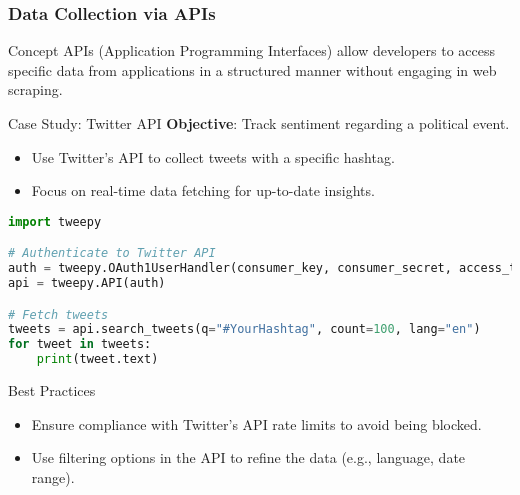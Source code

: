 \documentclass{beamer}
\begin{document}
\begin{frame}[fragile]
    \frametitle{Data Collection via APIs}
    
    \begin{block}{Concept}
        APIs (Application Programming Interfaces) allow developers to access specific data from applications in a structured manner without engaging in web scraping.
    \end{block}
    
    \begin{block}{Case Study: Twitter API}
        \textbf{Objective}: Track sentiment regarding a political event.
        \begin{itemize}
            \item Use Twitter's API to collect tweets with a specific hashtag.
            \item Focus on real-time data fetching for up-to-date insights.
        \end{itemize}
    \end{block}
    
    \begin{lstlisting}[language=Python]
import tweepy

# Authenticate to Twitter API
auth = tweepy.OAuth1UserHandler(consumer_key, consumer_secret, access_token, access_token_secret)
api = tweepy.API(auth)

# Fetch tweets
tweets = api.search_tweets(q="#YourHashtag", count=100, lang="en")
for tweet in tweets:
    print(tweet.text)
    \end{lstlisting}
    
    \begin{block}{Best Practices}
        \begin{itemize}
            \item Ensure compliance with Twitter’s API rate limits to avoid being blocked.
            \item Use filtering options in the API to refine the data (e.g., language, date range).
        \end{itemize}
    \end{block}
\end{frame}
\end{document}
